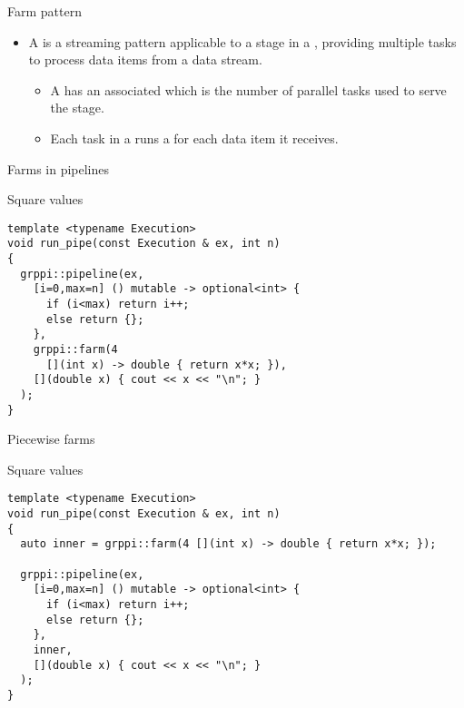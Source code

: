 \begin{frame}[t]{Farm pattern}
\begin{itemize}
  \item A  is a streaming pattern applicable to a stage in a ,
        providing multiple tasks to process data items from a data stream.
    \begin{itemize}
      \item A  has an associated  which is the number of parallel
             tasks used to serve the stage.
      \item Each task in a  runs a  for each data item it receives.
    \end{itemize}
\end{itemize}
\end{frame}

\begin{frame}[t,fragile]{Farms in pipelines}
\begin{block}{Square values}
\begin{lstlisting}
template <typename Execution>
void run_pipe(const Execution & ex, int n)
{
  grppi::pipeline(ex,
    [i=0,max=n] () mutable -> optional<int> {
      if (i<max) return i++;
      else return {};
    },
    grppi::farm(4
      [](int x) -> double { return x*x; }),
    [](double x) { cout << x << "\n"; }
  );
}
\end{lstlisting}
\end{block}
\end{frame}

\begin{frame}[t,fragile]{Piecewise farms}
\begin{block}{Square values}
\begin{lstlisting}
template <typename Execution>
void run_pipe(const Execution & ex, int n)
{
  auto inner = grppi::farm(4 [](int x) -> double { return x*x; });

  grppi::pipeline(ex,
    [i=0,max=n] () mutable -> optional<int> {
      if (i<max) return i++;
      else return {};
    },
    inner,
    [](double x) { cout << x << "\n"; }
  );
}
\end{lstlisting}
\end{block}
\end{frame}
